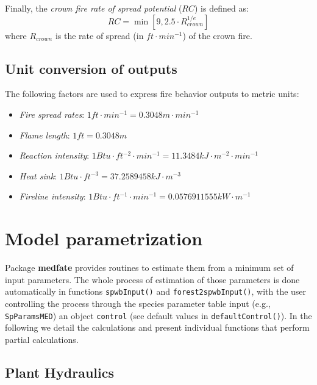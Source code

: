 \documentclass[]{book}
\providecommand{\tightlist}{%
  \setlength{\itemsep}{0pt}\setlength{\parskip}{0pt}}
\begin{document}
Finally, the \emph{crown fire rate of spread potential} (\(RC\)) is defined as:
\begin{equation}
RC = \min \left[ 9, 2.5 \cdot R_{crown}^{1/e} \right]
\end{equation}
where \(R_{crown}\) is the rate of spread (in \(ft \cdot min^{-1}\)) of the crown fire.

\hypertarget{unit-conversion-of-outputs}{%
\section{Unit conversion of outputs}\label{unit-conversion-of-outputs}}

The following factors are used to express fire behavior outputs to metric units:

\begin{itemize}
\tightlist
\item
  \emph{Fire spread rates}: \(1 ft\cdot min^{-1} = 0.3048 m\cdot min^{-1}\)
\item
  \emph{Flame length}: \(1 ft = 0.3048 m\)
\item
  \emph{Reaction intensity}: \(1 Btu\cdot ft^{-2} \cdot min^{-1} = 11.3484 kJ \cdot m^{-2}\cdot min^{-1}\)
\item
  \emph{Heat sink}: \(1 Btu\cdot ft^{-3} = 37.2589458 kJ \cdot m^{-3}\)
\item
  \emph{Fireline intensity}: \(1 Btu\cdot ft^{-1} \cdot min^{-1} = 0.0576911555 kW\cdot m^{-1}\)
\end{itemize}

\hypertarget{appendix-appendices}{%
\appendix}


\hypertarget{model-parametrization}{%
\chapter{Model parametrization}\label{model-parametrization}}

Package \textbf{medfate} provides routines to estimate them from a minimum set of input parameters. The whole process of estimation of those parameters is done automatically in functions \texttt{spwbInput()} and \texttt{forest2spwbInput()}, with the user controlling the process through the species parameter table input (e.g., \texttt{SpParamsMED}) an object \texttt{control} (see default values in \texttt{defaultControl()}). In the following we detail the calculations and present individual functions that perform partial calculations.

\hypertarget{plant-hydraulics-1}{%
\section{Plant Hydraulics}\label{plant-hydraulics-1}}
\end{document}
